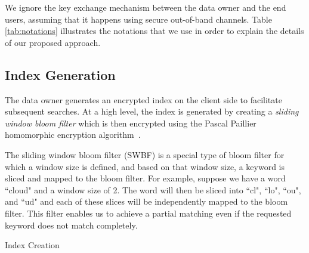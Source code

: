 We ignore the key exchange mechanism between the data owner and the end users, assuming
that it happens using secure out-of-band channels.
Table \ref{tab:notations} illustrates the notations that we use in order to explain
the details of our proposed approach.


\subsection{Index Generation}

The data owner generates an encrypted index on the client side to facilitate
subsequent searches. At a high level, the index is generated by creating a 
\textit{sliding window bloom filter} which is then encrypted using the Pascal Paillier
homomorphic encryption algorithm~\cite{pascal}. 

The sliding window bloom filter (SWBF) is a special type of bloom filter
for which a window size is defined, and based on that
window size, a keyword is sliced and mapped to the bloom filter. For example,
suppose we have a word ``cloud" and a window size of 2. The word will then be
sliced into ``cl", ``lo", ``ou", and ``ud" and each of these slices will be 
independently mapped to the bloom filter. This filter enables us to achieve
 a partial matching even if the requested keyword does not match
 completely.

\begin{algorithm}[b!]
\;
 \caption{Index Creation}
 \label{algo:IndexCreation}
\end{algorithm}

